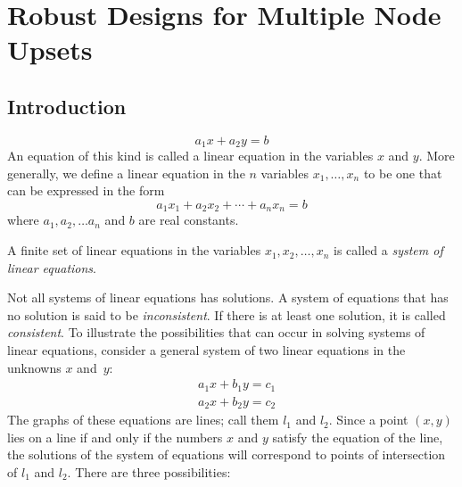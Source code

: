 
\chapter{Robust Designs for Multiple Node Upsets}




\section{Introduction}


%
%
\begin{equation*}
   a_1 x + a_2 y = b
\end{equation*}
%
An equation of this kind is called a linear equation in the variables
$x$ and $y$.  More generally, we define a linear equation in the $n$
variables $x_1,\ldots,x_n$ to be one that can be expressed in the form
%
\begin{equation}
   a_1 x_1 + a_2 x_2 + \cdots + a_n x_n = b 
\end{equation}
%
where $a_1, a_2, \ldots a_n$ and $b$ are real constants.

\begin{definition}
A finite set of linear equations in the variables $x_1, x_2, \ldots,
x_n$ is called a {\it system of linear equations}. 
\end{definition}

Not all systems of linear equations has solutions.  A system of
equations that has no solution is said to be {\it inconsistent}.  If
there is at least one solution, it is called {\it consistent}.  To
illustrate the possibilities that can occur in solving systems of linear
equations, consider a general system of two linear equations in the
unknowns $x$ and~$y$:
%
%
\begin{align*}
  & a_1 x + b_1 y = c_1  \\
  & a_2 x + b_2 y = c_2
\end{align*}
%
The graphs of these equations are lines; call them $l_1$ and $l_2$.
Since a point $(x,y)$ lies on a line if and only if the numbers $x$ and
$y$ satisfy the equation of the line, the solutions of the system of
equations will correspond to points of intersection of $l_1$ and $l_2$.
There are three possibilities:

